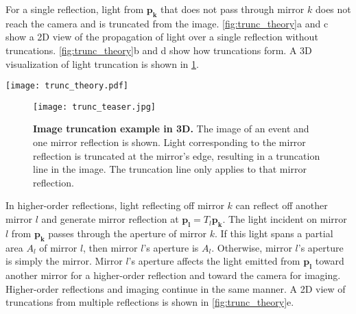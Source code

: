 For a single reflection, light from $\bm{p_k}$ that does not pass through mirror 
$k$ does not reach the camera and is truncated from the image.
\cref{fig:trunc_theory}a and c show a 2D view of the propagation of light over a single reflection without truncations.
\cref{fig:trunc_theory}b and d show how truncations form.
A 3D visualization of light truncation is shown in \cref{fig:trunc_teaser}.


\begin{figure*}
\centering
\texttt{[image: trunc\_theory.pdf]}
\caption{\textbf{Mirror apertures and image truncations.} 
An event emits light onto a mirror that reflects into the camera. 
Some light might not reach the sensor due to finite mirrors and defocus blur.
(a) The mirror reflection is located beyond the focal plane. 
All light that forms the mirror reflection reaches the sensor.
(b) The mirror reflection is located beyond the focal plane. 
Some light from the mirror reflection is stopped at the mirror's edge and 
truncated on the sensor.
(c) The mirror reflection is located within the focal plane.
All light that forms the mirror reflection reaches the sensor.
(d) The mirror reflection is located within the focal plane. 
Some light from the mirror reflection is stopped at the mirror's edge and 
truncated on the sensor.
(e) Light from a double mirror reflection is stopped at both mirrors' edges and truncated on the sensor. 
The mirror for the second reflection is illustrated along the optical axis.} 
\label{fig:trunc_theory}
\end{figure*}


\begin{figure}
\centering
\texttt{[image: trunc\_teaser.jpg]}
\caption{\textbf{Image truncation example in 3D.}
The image of an event and one mirror reflection is shown. 
Light corresponding to the mirror reflection is truncated at the mirror's edge, 
resulting in a truncation line in the image.
The truncation line only applies to that mirror reflection.}
\label{fig:trunc_teaser}
\end{figure}


In higher-order reflections, light reflecting off mirror $k$ can 
reflect off another mirror $l$ and generate mirror reflection 
at $\bm{p_l}=T_l \bm{p_k}$.
The light incident on mirror $l$ from $\bm{p_k}$ passes through the aperture 
of mirror $k$.
If this light spans a partial area $A_l$ of mirror $l$, then mirror $l$'s aperture is $A_l$.
Otherwise, mirror $l$'s aperture is simply the mirror.
Mirror $l$'s aperture affects the light emitted from $\bm{p_l}$ toward another 
mirror for a higher-order reflection and toward the camera for imaging.
Higher-order reflections and imaging continue in the same manner.
A 2D view of truncations from multiple reflections is shown in \cref{fig:trunc_theory}e.


